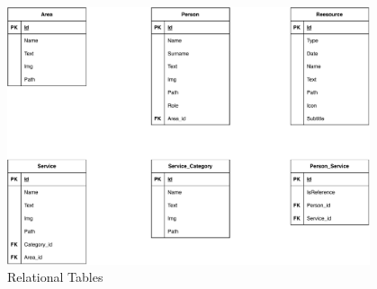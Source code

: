 \documentclass[12pt]{report}
\begin{document}
\begin{figure}[H]
	\centering
	\includegraphics[width=0.95\textwidth]{ER-Logic-Tables.pdf}
	\caption{Relational Tables}
\end{figure}


\listoffigures
\end{document}
